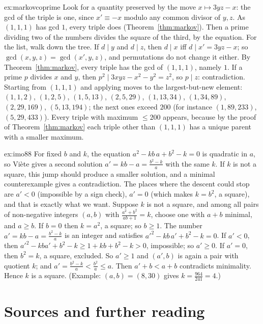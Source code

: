\begin{solution}{ex:markovcoprime}
\idea Look for a quantity preserved by the move $x\mapsto3yz-x$: the gcd of the triple is one, since $x'\equiv-x$ modulo any common divisor of $y,z$. As $(1,1,1)$ has gcd $1$, every triple does (Theorem~\ref{thm:markov}). Then a prime dividing two of the numbers divides the square of the third, by the equation. For the list, walk down the tree.
\writeup If $d\mid y$ and $d\mid z$, then $d\mid x$ iff $d\mid x'=3yz-x$; so $\gcd(x,y,z)=\gcd(x',y,z)$, and permutations do not change it either. By Theorem~\ref{thm:markov}, every triple has the gcd of $(1,1,1)$, namely $1$. If a prime $p$ divides $x$ and $y$, then $p^2\mid3xyz-x^2-y^2=z^2$, so $p\mid z$: contradiction. Starting from $(1,1,1)$ and applying moves to the largest-but-new element: $(1,1,2)$, $(1,2,5)$, $(1,5,13)$, $(2,5,29)$, $(1,13,34)$, $(1,34,89)$, $(2,29,169)$, $(5,13,194)$; the next ones exceed $200$ (for instance $(1,89,233)$, $(5,29,433)$). Every triple with maximum $\le200$ appears, because by the proof of Theorem~\ref{thm:markov} each triple other than $(1,1,1)$ has a unique parent with a smaller maximum.
\end{solution}

\begin{solution}{ex:imo88}
\idea For fixed $b$ and $k$, the equation $a^2-kb\,a+b^2-k=0$ is quadratic in $a$, so Vi\`ete gives a second solution $a'=kb-a=\frac{b^2-k}a$ with the same $k$. If $k$ is not a square, this jump should produce a smaller solution, and a minimal counterexample gives a contradiction. The places where the descent could stop are $a'<0$ (impossible by a sign check), $a'=0$ (which makes $k=b^2$, a square), and that is exactly what we want.
\writeup Suppose $k$ is not a square, and among all pairs of non-negative integers $(a,b)$ with $\frac{a^2+b^2}{ab+1}=k$, choose one with $a+b$ minimal, and $a\ge b$. If $b=0$ then $k=a^2$, a square; so $b\ge1$. The number $a'=kb-a=\frac{b^2-k}a$ is an integer and satisfies $a'^2-kb\,a'+b^2-k=0$. If $a'<0$, then $a'^2-kba'+b^2-k\ge1+kb+b^2-k>0$, impossible; so $a'\ge0$. If $a'=0$, then $b^2=k$, a square, excluded. So $a'\ge1$ and $(a',b)$ is again a pair with quotient $k$; and $a'=\frac{b^2-k}a<\frac{b^2}a\le a$. Then $a'+b<a+b$ contradicts minimality. Hence $k$ is a square. (Example: $(a,b)=(8,30)$ gives $k=\frac{964}{241}=4$.)
\end{solution}

\section*{Sources and further reading}

